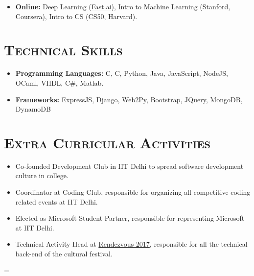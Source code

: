 \documentclass{article}
\newenvironment{longversion}{}{} %
\newenvironment{absolutelynopagebreak}
  {\par\nobreak\vfil\penalty0\vfilneg
   \vtop\bgroup}
  {\par\xdef\tpd{\the\prevdepth}\egroup
   \prevdepth=\tpd}
\newcommand{\CPP}
{C\nolinebreak[4]\hspace{-.05em}\raisebox{.22ex}{\footnotesize\bf ++}}
\newcommand{\tmpsection}[1]{}
\let\tmpsection=\section
\renewcommand{\section}[1]{\tmpsection*{\textsc{#1}}}
\begin{document}
\begin{absolutelynopagebreak}
\begin{longversion}
\begin{itemize}
\item \textbf{Online:}
Deep Learning (\href{http://www.fast.ai/}{Fast.ai}), Intro to Machine Learning (Stanford, Coursera), Intro to CS (CS50, Harvard).
\end{itemize}
\end{longversion}


\begin{longversion}
\section{Technical Skills}\begin{itemize}
\item \textbf{Programming Languages:}  C, \CPP, Python, Java, JavaScript, NodeJS, OCaml, VHDL, C\#, Matlab.
\item \textbf{Frameworks:} ExpressJS, Django, Web2Py, Bootstrap, JQuery, MongoDB, DynamoDB


\end{itemize}

\end{longversion}

\section{Extra Curricular Activities}


\begin{itemize}
    \setlength\itemsep{0em}
    \item Co-founded Development Club in IIT Delhi to spread software development culture in college.
    \item Coordinator at Coding Club, responsible for organizing all competitive coding related events at IIT Delhi.
    \item Elected as Microsoft Student Partner, responsible for representing Microsoft at IIT Delhi. 
    \item Technical Activity Head at \href{http://rdv-iitd.com/}{Rendezvous 2017}, responsible for all the technical back-end of the cultural festival.
     
\end{itemize}
\end{absolutelynopagebreak}
\end{document}
